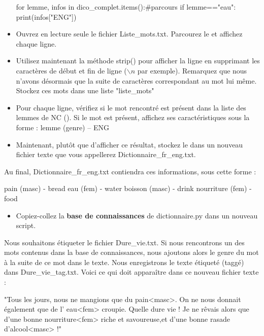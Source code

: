 \begin{itemize}
\begin{python}
for lemme, infos in dico_complet.items():#parcours
  if lemme=="eau":
    print(infos["ENG"])
\end{python}
 \item Ouvrez en lecture seule le fichier Liste\_mots.txt. Parcourez le et affichez chaque ligne.
\item Utilisez maintenant la méthode strip() pour afficher la ligne en supprimant les caractères de début et fin de ligne ($\backslash n$ par exemple). Remarquez que nous n'avons désormais que la suite de caractères correspondant au mot lui même. Stockez ces mots dans une liste "liste\_mots"
 \item Pour chaque ligne, vérifiez si le mot rencontré est présent dans la liste des lemmes de NC (). Si le mot est présent, affichez ses caractéristiques sous la forme : lemme (genre) -- ENG
\item Maintenant, plutôt que d'afficher ce résultat, stockez le dans un nouveau fichier texte que vous appellerez Dictionnaire\_fr\_eng.txt.
\end{itemize}

Au final, Dictionnaire\_fr\_eng.txt contiendra ces informations, sous cette forme :
\begin{python}
pain (masc) - bread
eau (fem) - water
boisson (masc) - drink
nourriture (fem) - food
\end{python}

\exer

\begin{itemize}
 \item Copiez-collez la \textbf{base de connaissances} de dictionnaire.py dans un nouveau script.
\end{itemize}

Nous souhaitons étiqueter le fichier Dure\_vie.txt. Si nous rencontrons un des mots
contenus dans la base de connaissances, nous ajoutons alors le genre du mot à la
suite de ce mot dans le texte. Nous enregistrons le texte étiqueté (taggé) dans
Dure\_vie\_tag.txt. Voici ce qui doit apparaître dans ce nouveau fichier texte :

\begin{python}
"Tous les jours, nous ne mangions que du pain<masc>.
On ne nous donnait également que de l' eau<fem> croupie.
Quelle dure vie !
Je ne rêvais alors que d'une bonne nourriture<fem> 
riche et savoureuse,et d'une bonne rasade d'alcool<masc> !"
\end{python}

